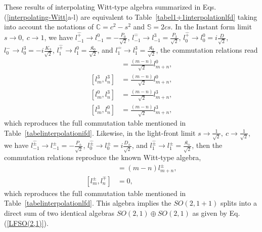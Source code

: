 \documentclass[%
 reprint,
superscriptaddress,
 amsmath,amssymb,
 aps,
]{revtex4-2}
\begin{document}
These results of interpolating Witt-type algebra summarized in Eqs.(\ref{interpolating-Witt}a-l) are equivalent to Table~\ref{tabel1+1interpolationlfd} taking into account the notations of 
$\mathbb{C} = c^2 -s^2$ and $\mathbb{S} = 2 cs$. 
In the Instant form limit $s\rightarrow0,~c\rightarrow1$, we have  $l^{\hat{+}}_{-1}\rightarrow l^{0}_{-1}=-\frac{P_{0}}{\sqrt{2}}$, $l^{\hat{-}}_{-1}\rightarrow l^{3}_{-1}= \frac{P_{3}}{\sqrt{2}}$, $l^{\hat{+}}_{0}\rightarrow l^{0}_{0}=i\frac{D}{\sqrt{2}}$, 
$l^{\hat{-}}_{0}\rightarrow l^{3}_{0}= -i\frac{K_{3}}{\sqrt{2}}$, $l^{\hat{+}}_{1}\rightarrow l^{0}_{1}= \frac{\mathfrak{K}_{0}}{\sqrt{2}}$, and $l^{\hat{-}}_{1}\rightarrow l^{3}_{1}= \frac{\mathfrak{K}_{3}}{\sqrt{2}}$, the commutation relations read
 \begin{align}
    [l^{0}_m,l^{0}_n]&=\frac{(m-n)}{\sqrt{2}}l^{0}_{m+n},\\
    [l^{3}_m,l^{3}_n]&=\frac{(m-n)}{\sqrt{2}}l^{0}_{m+n},\\
    [l^{0}_m,l^{3}_n]&=\frac{(m-n)}{\sqrt{2}}l^{3}_{m+n},\\
    [l^{3}_m,l^{0}_n]&=\frac{(m-n)}{\sqrt{2}}l^{3}_{m+n},
\end{align}
which reproduces the full commutation table mentioned in Table~\ref {tabelinterpolationifd}.
%
Likewise, 
in the light-front limit $s\rightarrow\frac{1}{\sqrt{2}},~c\rightarrow\frac{1}{\sqrt{2}}$, we have $ l^{\hat{\pm}}_{-1}\rightarrow l^{\pm}_{-1}=-\frac{P_{\pm}}{\sqrt{2}}$, $l^{\hat{\pm}}_{0}\rightarrow l^{\pm}_{0}=i\frac{D_{\pm}}{\sqrt{2}}$, and $l^{\hat{\pm}}_{1}\rightarrow l^{\pm}_{1}= \frac{\mathfrak{K}_{\pm}}{\sqrt{2}}$, then the commutation relations reproduce the known Witt-type algebra,
\begin{align}
    [l^{\pm}_m,l^{\pm}_n]&=(m-n)l^{\pm}_{m+n},\\
    [l^{\pm}_m,l^{\mp}_n]&=0,
\end{align}
which reproduces the full commutation table mentioned in Table~\ref {tabelinterpolationlfd}. This algebra implies the $SO(2,1+1)$ splits into a direct sum of two identical algebras $SO(2,1)\oplus SO(2,1)$ as given by Eq.(\ref{LFSO(2,1)}).
\end{document}
